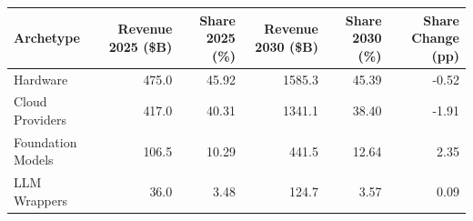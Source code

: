 

\begin{tabular}{@{}lrrrrr@{}}
\toprule
Archetype & Revenue 2025 (\$B) & Share 2025 (\%) & Revenue 2030 (\$B) & Share 2030 (\%) & Share Change (pp) \\
\midrule
Hardware & 475.0 & 45.92 & 1585.3 & 45.39 & -0.52 \\
Cloud Providers & 417.0 & 40.31 & 1341.1 & 38.40 & -1.91 \\
Foundation Models & 106.5 & 10.29 & 441.5 & 12.64 & 2.35 \\
LLM Wrappers & 36.0 & 3.48 & 124.7 & 3.57 & 0.09 \\
\bottomrule
\end{tabular}